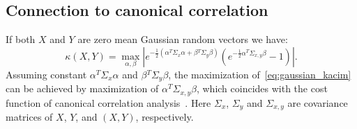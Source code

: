 \documentclass{article}
\begin{document}
\subsection{Connection to canonical correlation}
If both $X$ and $Y$ are zero mean Gaussian random vectors we have:
\begin{equation}
\label{eq:gaussian_kacim}
\kappa(X,Y) = \max_{\alpha, \beta} | e^{-\frac{1}{2} (\alpha^{T}\Sigma_{x}\alpha + \beta{^T}\Sigma_{y}\beta)}(e^{-\frac{1}{2}\alpha{^T}\Sigma_{x,y}\beta} - 1)|.
\end{equation}
Assuming constant $\alpha^{T}\Sigma_{x}\alpha$ and  $\beta{^T}\Sigma_{y}\beta$, the maximization of~\eqref{eq:gaussian_kacim} can be achieved by maximization of  $\alpha{^T}\Sigma_{x,y}\beta$, which coincides with the cost function of canonical correlation analysis~\cite{10.5555/3279302}. Here $\Sigma_{x}$, $\Sigma_{y}$ and  $\Sigma_{x,y}$ are covariance matrices of $X$, $Y$, and $(X,Y)$, respectively. %
\end{document}
